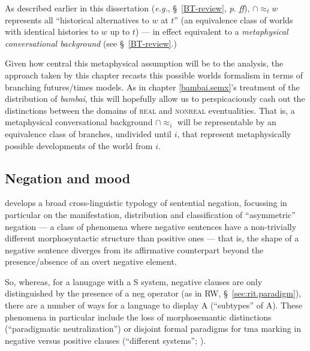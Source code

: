 \noindent As described earlier in this dissertation (\textit{e.g.}, \S~\ref{BT-review}, \textit{p.} \pageref{par:settledness}\textit{ff}), $\cap\!\approx_t\!w $ represents all ``historical alternatives to $ w $ at $ t $'' (an equivalence class of worlds with identical histories to $ w $ up to $ t $) --- in effect equivalent to a \textit{metaphysical conversational background} (see \S~\ref{BT-review}.)


 Given how central this metaphysical assumption will be to the analysis, the approach taken by this chapter recasts this possible worlds formalism in terms of branching futures/times models. As in chapter \ref{bambai.semx}'s treatment of the distribution of \textit{bambai}, this will hopefully allow us to perspicaciously cash out the distinctions between the domains of \textsc{real} and \textsc{nonreal} eventualities. That is, a metaphysical conversational background $ \cap\!\approx_i $ will be representable by an equivalence class of branches, undivided until $ i $, that represent metaphysically possible developments of the world from $ i $.

\subsection{Negation and mood}\label{sec:asymneg}

\citeauthor{Miestamo2005} develops a broad cross-linguistic typology of sentential negation, focussing in particular on the manifestation, distribution and classification of ``asymmetric'' negation --- a class of phenomena where negative sentences have a non-trivially different morphosyntactic structure than positive ones --- that is, the shape of a negative sentence diverges from its affirmative counterpart beyond the presence/absence of an overt negative element.

So, whereas, for a lanugage with a \acrfull{S} system, negative clauses are only distinguished by the presence of a \gls{neg} operator (as in \acrshort{RW}, \S~\ref{sec:rit.paradigm}), there are a number of ways for a language to display \acrfull{A} (``subtypes'' of \acrshort{A}). These phenomena in particular include the loss of morphosemantic distinctions (``paradigmatic neutralization'') or disjoint formal paradigms for \acrshort{tma} marking in negative versus positive clauses (``different systems''; \citeyear[51--5]{Miestamo2005}).

